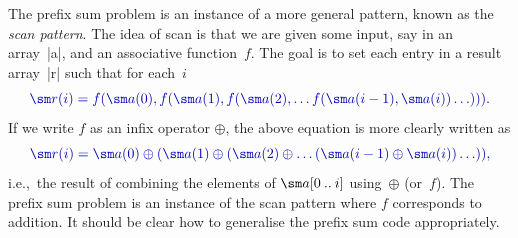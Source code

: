 The prefix sum problem is an instance of a more general pattern, known as the
\emph{scan pattern}.  The idea of scan is that we are
given some input, say in an array~|a|, and an associative function~$f$.  The
goal is to set each entry in a result array~|r| such that for each~$i$
\[\mstyle
\sm r(i) = 
 f(\sm a(0), f(\sm a(1), f(\sm a(2), \ldots  f(\sm a(i-1), \sm a(i)) \ldots ))).
\]
If we write $f$ as an infix operator $\oplus$, the above equation is more
clearly written as
\[\mstyle
\sm r(i) = 
 \sm a(0) \oplus (\sm a(1) \oplus(\sm a(2) \oplus \ldots  
 (\sm a(i-1) \oplus \sm a(i)) \ldots  )),
\]
i.e.,~the result of combining the elements of $\sm a[0 \upto i]$
using~$\oplus$ (or~$f$).  The prefix sum problem is an instance of the scan
pattern where $f$ corresponds to addition.  It should be clear how to
generalise the prefix sum code appropriately.


